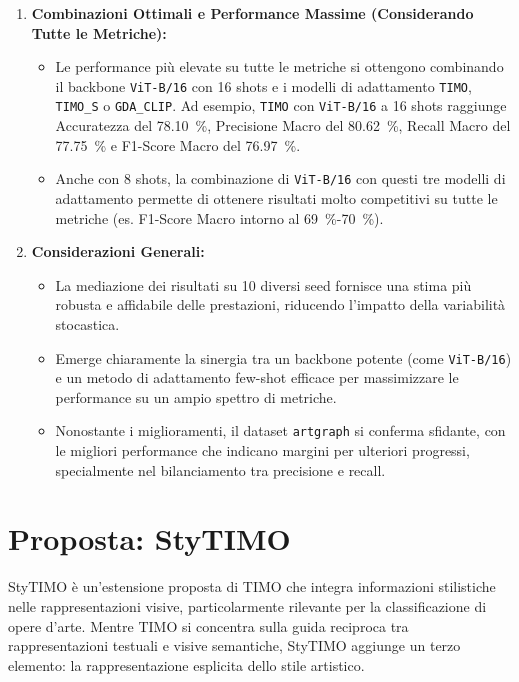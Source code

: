 \documentclass[11pt,a4paper]{article}
\begin{document}
\begin{enumerate}
    \item \textbf{Combinazioni Ottimali e Performance Massime (Considerando Tutte le Metriche):}
    \begin{itemize}[label=\textbullet, leftmargin=*]
        \item Le performance più elevate su tutte le metriche si ottengono combinando il backbone \texttt{ViT-B/16} con 16 shots e i modelli di adattamento \texttt{TIMO}, \texttt{TIMO\_S} o \texttt{GDA\_CLIP}. Ad esempio, \texttt{TIMO} con \texttt{ViT-B/16} a 16 shots raggiunge Accuratezza del \SI{78.10}{\percent}, Precisione Macro del \SI{80.62}{\percent}, Recall Macro del \SI{77.75}{\percent} e F1-Score Macro del \SI{76.97}{\percent}.
        \item Anche con 8 shots, la combinazione di \texttt{ViT-B/16} con questi tre modelli di adattamento permette di ottenere risultati molto competitivi su tutte le metriche (es. F1-Score Macro intorno al \SI{69}{\percent}-\SI{70}{\percent}).
    \end{itemize}

    \item \textbf{Considerazioni Generali:}
    \begin{itemize}[label=\textbullet, leftmargin=*]
        \item La mediazione dei risultati su 10 diversi seed fornisce una stima più robusta e affidabile delle prestazioni, riducendo l'impatto della variabilità stocastica.
        \item Emerge chiaramente la sinergia tra un backbone potente (come \texttt{ViT-B/16}) e un metodo di adattamento few-shot efficace per massimizzare le performance su un ampio spettro di metriche.
        \item Nonostante i miglioramenti, il dataset \texttt{artgraph} si conferma sfidante, con le migliori performance che indicano margini per ulteriori progressi, specialmente nel bilanciamento tra precisione e recall.
    \end{itemize}
\end{enumerate}
\section{Proposta: StyTIMO}
StyTIMO è un'estensione proposta di TIMO che integra informazioni stilistiche nelle rappresentazioni visive, particolarmente rilevante per la classificazione di opere d'arte. Mentre TIMO si concentra sulla guida reciproca tra rappresentazioni testuali e visive semantiche, StyTIMO aggiunge un terzo elemento: la rappresentazione esplicita dello stile artistico.
\end{document}
